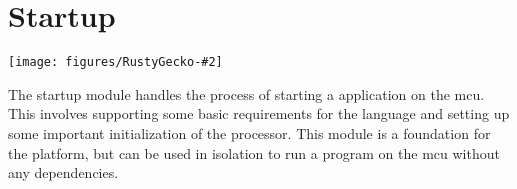 


\newcommand{\corechapter}[3]{
  \chapter{#1}
  \label{chap:#2}
  \begin{center}
    \texttt{[image: figures/RustyGecko-\#2]}
  \end{center}
  \hfill \break
  \hfill \break
  \hfill \break
#3
}

\corechapter{Startup}{startup}{%
  The startup module handles the process of starting a {\rust} application on the \gls{mcu}.
  This involves supporting some basic requirements for the language and setting up some important initialization of the processor.
  This module is a foundation for the {\rg} platform, but can be used in isolation to run a program on the \gls{mcu} without any dependencies.
}


